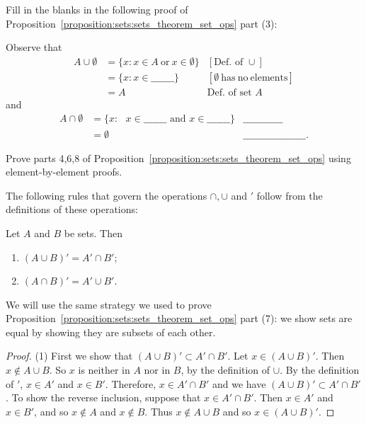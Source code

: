 \begin{exercise}{}
Fill in the blanks in the following proof of Proposition~\ref{proposition:sets:sets_theorem_set_ops} part (3):

\medskip{}
\noindent
Observe that
\begin{align*}
A \cup \emptyset & =  \{ x : x \in A \mathrm{~or~}x \in \emptyset \}    & [\text{Def. of }\cup] \\
& = \{ x : x \in \_\_\_\_\_\_\_ \}     & [\emptyset \mathrm{~has~no~elements}] \\
& =  A & \text{Def. of set }A 
\end{align*}
and
\begin{align*}
A \cap \emptyset & =  \{ x : \mbox{ $x \in \_\_\_\_\_\_\_$ and $x \in \_\_\_\_\_\_\_$} \}     & \_\_\_\_\_\_\_\_\_\_\_\_ \\
& =  \emptyset     & \_\_\_\_\_\_\_\_\_\_\_\_\_\_\_\_\_\_\_ .
\end{align*}
\end{exercise}

\begin{exercise}{26}
Prove parts 4,6,8 of Proposition~\ref{proposition:sets:sets_theorem_set_ops} using element-by-element proofs.
\end{exercise}

\medskip{}
\noindent
The following rules that govern the operations $\cap, \cup$ and $'$  follow from the definitions of these operations:

\begin{thm}\label{sets_de_morgan}
Let $A$ and $B$ be sets. Then 
\begin{enumerate}[(1)]
 \item
$(A \cup B)' = A' \cap B'$; 
 \item
$(A \cap B)' = A' \cup B'$.
 \end{enumerate}
\end{thm}
 
 We will use the same strategy we used to prove Proposition~\ref{proposition:sets:sets_theorem_set_ops} part (7): we show sets are equal by showing they are subsets of each other.
\medskip{}

\begin{proof} 

\noindent
(1)
First we show that $(A \cup B)' \subset A' \cap B'$.  Let $x \in (A \cup B)'$.  Then $x \notin A \cup B$. So $x$ is neither in $A$ nor in $B$, by the definition of $\cup$.  By the definition of $'$, $x \in A'$ and $x \in B'$.  Therefore, $x \in A' \cap B'$ and we have $(A \cup B)' \subset A' \cap B'$.
 To show the reverse inclusion, suppose that $x \in A' \cap B'$.  Then $x \in A'$ and $x \in B'$, and so $x \notin A$ and $x \notin B$.  Thus $x \notin A \cup B$ and so $x \in (A \cup B)'$.  
\end{proof}

